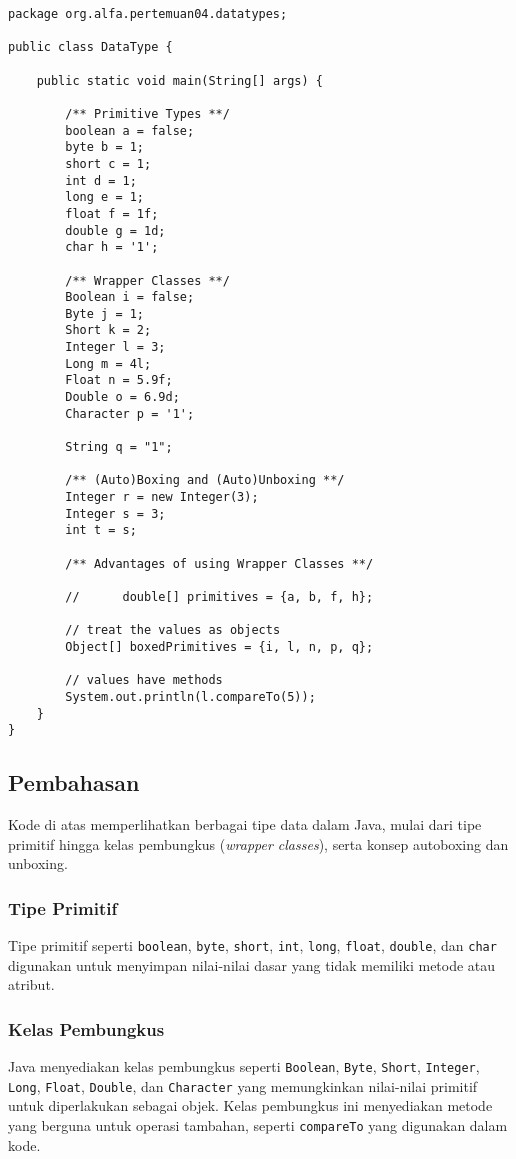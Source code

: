 \begin{lstlisting}[style=JavaStyle, caption={Primitive Types, Wrapper Classes, and Autoboxing in Java}]
package org.alfa.pertemuan04.datatypes;

public class DataType {
	
	public static void main(String[] args) {
		
		/** Primitive Types **/
		boolean a = false;
		byte b = 1;
		short c = 1;
		int d = 1;
		long e = 1;
		float f = 1f;
		double g = 1d;
		char h = '1';
		
		/** Wrapper Classes **/
		Boolean i = false;
		Byte j = 1;
		Short k = 2;
		Integer l = 3;
		Long m = 4l;
		Float n = 5.9f;
		Double o = 6.9d;
		Character p = '1';
		
		String q = "1";
		
		/** (Auto)Boxing and (Auto)Unboxing **/
		Integer r = new Integer(3); 
		Integer s = 3;
		int t = s;
		
		/** Advantages of using Wrapper Classes **/
		
		//      double[] primitives = {a, b, f, h};
		
		// treat the values as objects
		Object[] boxedPrimitives = {i, l, n, p, q};
		
		// values have methods
		System.out.println(l.compareTo(5));
	}
}
\end{lstlisting}

\subsection{Pembahasan}
Kode di atas memperlihatkan berbagai tipe data dalam Java, mulai dari tipe primitif hingga kelas pembungkus (\textit{wrapper classes}), serta konsep autoboxing dan unboxing.

\subsubsection{Tipe Primitif}
Tipe primitif seperti \texttt{boolean}, \texttt{byte}, \texttt{short}, \texttt{int}, \texttt{long}, \texttt{float}, \texttt{double}, dan \texttt{char} digunakan untuk menyimpan nilai-nilai dasar yang tidak memiliki metode atau atribut.

\subsubsection{Kelas Pembungkus}
Java menyediakan kelas pembungkus seperti \texttt{Boolean}, \texttt{Byte}, \texttt{Short}, \texttt{Integer}, \texttt{Long}, \texttt{Float}, \texttt{Double}, dan \texttt{Character} yang memungkinkan nilai-nilai primitif untuk diperlakukan sebagai objek. Kelas pembungkus ini menyediakan metode yang berguna untuk operasi tambahan, seperti \texttt{compareTo} yang digunakan dalam kode.

